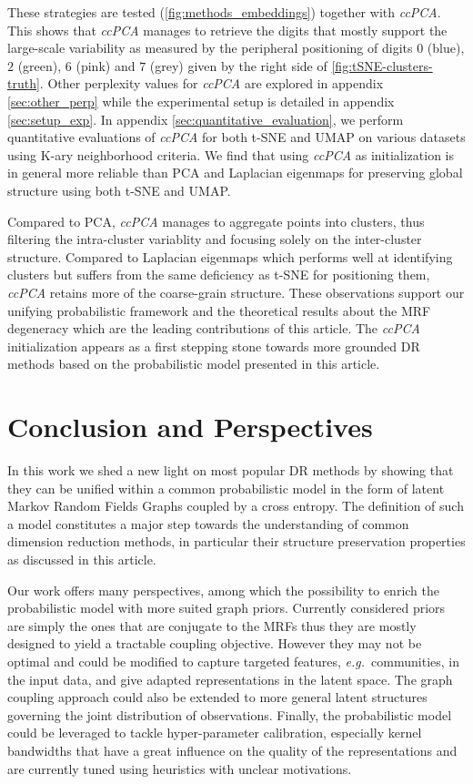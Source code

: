These strategies are tested (\cref{fig:methods_embeddings}) together with \textit{ccPCA}. This shows that 
\textit{ccPCA} manages to retrieve the digits that mostly support the large-scale variability as measured by the peripheral positioning of digits $0$ (blue), $2$ (green), $6$ (pink) and $7$ (grey) given by the right side of \cref{fig:tSNE-clusters-truth}. Other perplexity values for \textit{ccPCA} are explored in appendix \ref{sec:other_perp} while the experimental setup is detailed in appendix \ref{sec:setup_exp}. In appendix \ref{sec:quantitative_evaluation}, we perform quantitative evaluations of \textit{ccPCA} for both t-SNE and UMAP on various datasets using K-ary neighborhood criteria. We find that using \textit{ccPCA} as initialization is in general more reliable than PCA and Laplacian eigenmaps for preserving global structure using both t-SNE and UMAP. 

Compared to PCA, \textit{ccPCA} manages to aggregate points into clusters, thus filtering the intra-cluster variablity and focusing solely on the inter-cluster structure. Compared to Laplacian eigenmaps which performs well at identifying clusters but suffers from the same deficiency as t-SNE for positioning them, \textit{ccPCA} retains more of the coarse-grain structure. These observations support our unifying probabilistic framework and the theoretical results about the MRF degeneracy which are the leading contributions of this article. The \textit{ccPCA} initialization appears as a first stepping stone towards more grounded DR methods based on the probabilistic model presented in this article.

\section{Conclusion and Perspectives}\label{Perspectives}

In this work we shed a new light on most popular DR methods by showing that they can be unified within a common probabilistic model in the form of latent Markov Random Fields Graphs coupled by a cross entropy. The definition of such a model constitutes a major step towards the understanding of common dimension reduction methods, in particular their structure preservation properties as discussed in this article. 

Our work offers many perspectives, among which the possibility to enrich the probabilistic model with more suited graph priors. Currently considered priors are simply the ones that are conjugate to the MRFs thus they are mostly designed to yield a tractable coupling objective. However they may not be optimal and could be modified to capture targeted features, \textit{e.g.}\ communities, in the input data, and give adapted representations in the latent space. The graph coupling approach could also be extended to more general latent structures governing the joint distribution of observations.
Finally, the probabilistic model could be leveraged to tackle hyper-parameter calibration, especially kernel bandwidths that have a great influence on the quality of the representations and are currently tuned using heuristics with unclear motivations.